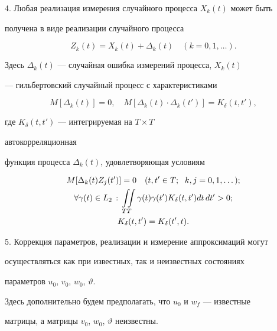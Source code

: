  


4. Любая реализация измерения случайного процесса $X_k(t)$ может быть 


получена в виде реализации случайного процесса 


\begin{equation} 


Z_k(t)=X_k(t)+\Delta_k(t)\quad (k=0,1,\dotsc). 


\end{equation} 


Здесь $\Delta_k(t)$ --- случайная ошибка измерений процесса, $X_k(t)$ 


--- гильбертовский случайный процесс с характеристиками 


\begin{equation} 


M[\Delta_k(t)]=0,\quad 


M[\Delta_k(t)\cdot\Delta_k(t')]=K_\delta(t,t'), 


\end{equation} 


где $K_\delta(t,t')$ --- интегрируемая на $T\times T$ 


автокорреляционная 


функция процесса $\Delta_k(t)$, удовлетворяющая условиям 


\begin{gather} 


M[\Delta_k(t)Z_j(t')]=0\quad (t,t'\in T;\ \;k,j=0,1,\dotsc);\notag\\ 


\forall\gamma(t)\in L_2\,:\,\iint\limits_{TT} 


\gamma(t)\gamma(t')K_\delta(t,t')dt\,dt'>0;\\ 


K_\delta(t,t')=K_\delta(t',t).\notag 


\end{gather} 


 


5. Коррекция параметров, реализации и измерение аппроксимаций могут 


осуществляться как при известных, так и неизвестных состояниях 


параметров $u_0$, $v_0$, $w_0$, $\vartheta$. 


Здесь дополнительно будем предполагать, что $u_0$ и $w_f$ --- известные 


матрицы, а матрицы $v_0$, $w_0$, $\vartheta$ неизвестны. 


